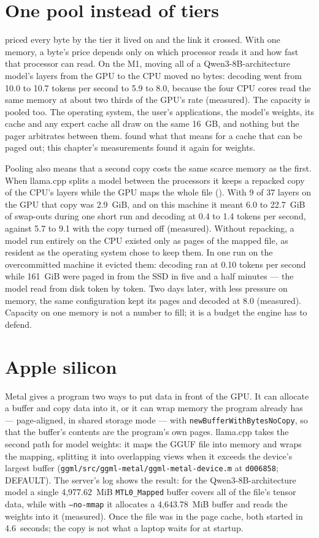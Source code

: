 \section{One pool instead of tiers}

 priced every byte by the tier it lived on and the link it
crossed. With one memory, a byte's price depends only on which processor reads
it and how fast that processor can read. On the M1, moving all of a Qwen3-8B-architecture
model's layers from the GPU to the CPU moved no bytes: decoding went from 10.0
to 10.7 tokens per second to 5.9 to 8.0, because the four CPU cores read the
same memory at about two thirds of the GPU's rate (measured). The capacity
is pooled too. The operating system, the user's applications, the model's
weights, its cache and any expert cache all draw on the same 16~GB, and
nothing but the pager arbitrates between them.  found
what that means for a cache that can be paged out; this chapter's measurements
found it again for weights.

Pooling also means that a second copy costs the same scarce memory as the
first. When llama.cpp splits a model between the processors it keeps a
repacked copy of the CPU's layers while the GPU maps the whole file
(). With 9 of 37 layers on the GPU that copy was 2.9~GiB,
and on this machine it meant 6.0 to 22.7~GiB of swap-outs during one short run
and decoding at 0.4 to 1.4 tokens per second, against 5.7 to 9.1 with the copy
turned off (measured). Without repacking, a model run entirely on the CPU
existed only as pages of the mapped file, as resident as the operating system
chose to keep them. In one run on the overcommitted machine it evicted them:
decoding ran at 0.10 tokens per second while 161~GiB were paged in from the SSD
in five and a half minutes --- the model read from disk token by token. Two days
later, with less pressure on memory, the same configuration kept its pages and
decoded at 8.0 (measured). Capacity on one memory is not a
number to fill; it is a budget the engine has to defend.

\section{Apple silicon}

Metal gives a program two ways to put data in front of the GPU. It can
allocate a buffer and copy data into it, or it can wrap memory the program
already has --- page-aligned, in shared storage mode --- with
\texttt{newBufferWithBytesNoCopy}, so that the buffer's contents are the
program's own pages. llama.cpp takes the second path for model weights: it maps
the GGUF file into memory and wraps the mapping, splitting it into overlapping
views when it exceeds the device's largest buffer
(\texttt{ggml/src/ggml-metal/ggml-metal-device.m} at \texttt{d006858}; DEFAULT).
The server's log shows the result: for the Qwen3-8B-architecture model a single
4,977.62~MiB \texttt{MTL0\_Mapped} buffer covers all of the file's tensor data,
while with \texttt{--no-mmap} it allocates a 4,643.78~MiB buffer and reads the
weights into it (measured). Once the file was in the page cache, both started in
4.6~seconds; the copy is not what a laptop waits for at startup.

